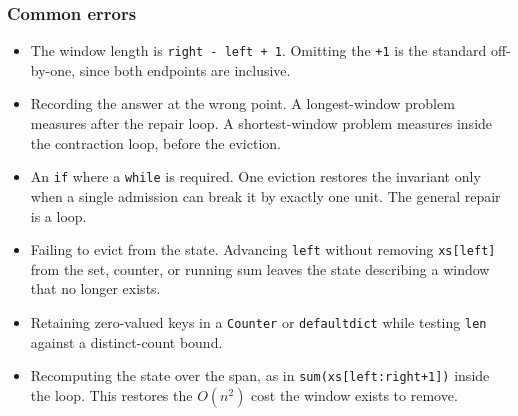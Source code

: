 \subsubsection*{Common errors}

\begin{itemize}
  \item The window length is \texttt{right - left + 1}. Omitting the
        \texttt{+1} is the standard off-by-one, since both endpoints are
        inclusive.
  \item Recording the answer at the wrong point. A longest-window problem
        measures after the repair loop. A shortest-window problem measures
        inside the contraction loop, before the eviction.
  \item An \texttt{if} where a \texttt{while} is required. One eviction restores
        the invariant only when a single admission can break it by exactly one
        unit. The general repair is a loop.
  \item Failing to evict from the state. Advancing \texttt{left} without
        removing \texttt{xs[left]} from the set, counter, or running sum leaves
        the state describing a window that no longer exists.
  \item Retaining zero-valued keys in a \texttt{Counter} or
        \texttt{defaultdict} while testing \texttt{len} against a distinct-count
        bound.
  \item Recomputing the state over the span, as in \texttt{sum(xs[left:right+1])}
        inside the loop. This restores the $O(n^2)$ cost the window exists to
        remove.
\end{itemize}
